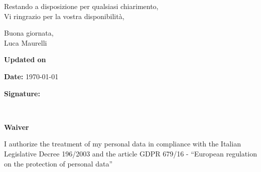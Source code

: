 \documentclass[10pt]{article}
\begin{document}
Restando a disposizione per qualsiasi chiarimento,\\
Vi ringrazio per la vostra disponibilità,

Buona giornata,\\
Luca Maurelli
\vfill
{\centering \textbf{Updated on} \par}
\begin{minipage}[t]{.49\textwidth}
	\raggedright
	{\textbf{Date:} \textsc{\today}\par}
\end{minipage}%
\hfill
\begin{minipage}[t]{.49\textwidth}
	\raggedleft
	{\textbf{Signature:}\hspace{5cm} \par}
\end{minipage}
\vspace{3cm}\\
\vfill
{\centering \textbf{Waiver} \par}
{\small I authorize the treatment of my personal data in compliance with the Italian Legislative Decree 196/2003 and the article GDPR 679/16 - “European regulation on the protection of personal data”}
\end{document}

